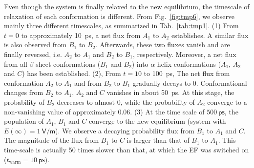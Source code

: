 \documentclass[a4paper,preprint,unsortedaddress,onecolumn]{revtex4-1}
\begin{document}
Even though the system is finally relaxed to the new equilibrium,
the timescale of relaxation of each conformation is different. 
From Fig.~\ref{fig:tmp6}, we observe mainly
three different timescales, as summarized in Tab.~\ref{tab:tmp1}.
(1) From
$t=0$ to approximately 10~\textsf{ps}, a net flux from 
$A_1$ to $A_2$ establishes.
A similar flux is also observed from $B_1$ to $B_2$.
Afterwards, these two fluxes vanish and are finally reversed,
i.e. $A_2$ to $A_1$ and $B_2$ to $B_1$, respectively.
Moreover, a net flux from all $\beta$-sheet conformations
($B_1$ and $B_2$) into $\alpha$-helix conformations ($A_1$, $A_2$ and
$C$) has been established.
(2), From $t=10$ to
100~\textsf{ps},
The net flux from  conformation $A_2$ to $A_1$ and from $B_2$ to $B_1$
gradually decays to 0. Conformational changes from $B_2$ to $A_1$, $A_2$ and $C$
vanishes in about 50~ps.
At this stage, the probability of $B_2$ decreases to almost 0,
while the probability of $A_2$
converge to a non-vanishing value of approximately 0.06.
(3) At the time scale of $
500~\textsf{ps}$, the population of $A_1$, $B_1$ and $C$ converge to
the new equilibrium (system with $E(\infty) = 1~\textsf{V/m}$).
We observe a decaying probability flux from $B_1$ 
to $A_1$ and $C$.
The magnitude of the flux from $B_1$ to  $C$ is larger than that of $B_1$ to  $A_1$.
This time-scale is actually 50 times slower than that, at which
the EF was switched on ($t_{\textrm{warm}} = 10~\textsf{ps}$).
\end{document}
